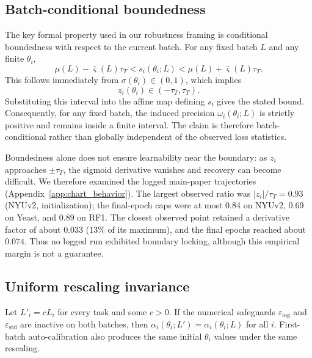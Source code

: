\subsection{Batch-conditional boundedness}
\label{sec:boundedness}
The key formal property used in our robustness framing is conditional boundedness with respect to the current batch. For any fixed batch $L$ and any finite $\theta_i$,
\begin{equation}
\mu(L)-\bar{\varsigma}(L)\tau_T
<
s_i(\theta_i;L)
<
\mu(L)+\bar{\varsigma}(L)\tau_T.
\end{equation}
This follows immediately from $\sigma(\theta_i)\in(0,1)$, which implies
\begin{equation}
z_i(\theta_i)\in(-\tau_T,\tau_T).
\end{equation}
Substituting this interval into the affine map defining $s_i$ gives the stated bound. Consequently, for any fixed batch, the induced precision $\omega_i(\theta_i;L)$ is strictly positive and remains inside a finite interval. The claim is therefore batch-conditional rather than globally independent of the observed loss statistics.

Boundedness alone does not ensure learnability near the boundary: as $z_i$ approaches
$\pm\tau_T$, the sigmoid derivative vanishes and recovery can become difficult. We therefore
examined the logged main-paper trajectories (Appendix~\ref{app:chart_behavior}). The largest
observed ratio was $|z_i|/\tau_T=0.93$ (NYUv2, initialization); the final-epoch caps were at most
0.84 on NYUv2, 0.69 on Yeast, and 0.89 on RF1. The closest observed point retained a derivative
factor of about $0.033$ (13\% of its maximum), and the final epochs reached about $0.074$.
Thus no logged run exhibited boundary locking, although this empirical margin is not a guarantee.

\subsection{Uniform rescaling invariance}
\label{sec:invariance}
\begin{proposition}
\label{prop:invariance}
Let $L'_i=cL_i$ for every task and some $c>0$. If the numerical safeguards
$\varepsilon_{\log}$ and $\varepsilon_{\mathrm{std}}$ are inactive on both batches, then
$\alpha_i(\theta_i;L')=\alpha_i(\theta_i;L)$ for all $i$. First-batch auto-calibration also
produces the same initial $\theta_i$ values under the same rescaling.
\end{proposition}

